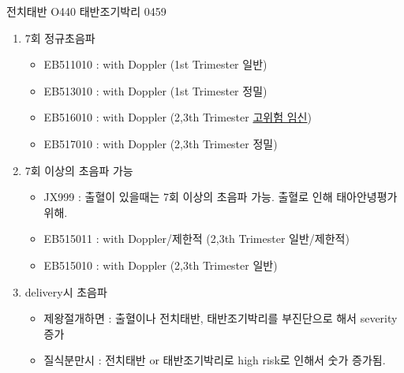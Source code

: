 \par
\clearpage
\begin{commentbox}{전치태반 O440 태반조기박리 0459}
\begin{enumerate}\tightlist
\item 7회 정규초음파
	\begin{itemize}\tightlist
	\item EB511010 : with Doppler (1st Trimester 일반) 
	\item EB513010 : with Doppler (1st Trimester 정밀) 
	\item EB516010 : with Doppler (2,3th Trimester \uline{고위험 임신}) 
	\item EB517010 : with Doppler (2,3th Trimester 정밀) 
	\end{itemize}
\item 7회 이상의 초음파 가능
	\begin{itemize}\tightlist
	\item JX999 : 출혈이 있을때는 7회 이상의 초음파 가능. 출혈로 인해 태아안녕평가위해.
	\item EB515011 : with Doppler/제한적 (2,3th Trimester 일반/제한적)
	\item EB515010 : with Doppler (2,3th Trimester 일반)
	\end{itemize}	
\item delivery시 초음파
	\begin{itemize}\tightlist
	\item 제왕절개하면 : 출혈이나 전치태반, 태반조기박리를 부진단으로 해서 severity증가
	\item 질식분만시 : 전치태반 or 태반조기박리로 high risk로 인해서 숫가 증가됨.
	\end{itemize}
\end{enumerate}
\end{commentbox}


